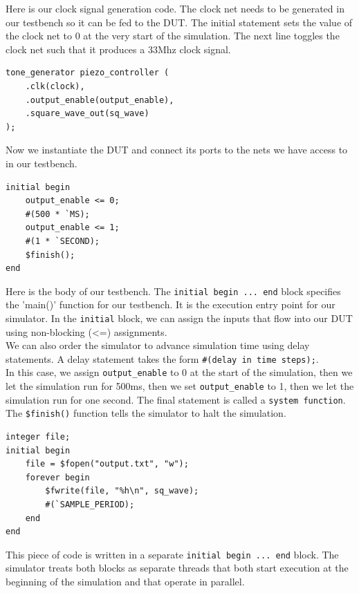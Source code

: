 \documentclass[11pt]{article}
\begin{document}
Here is our clock signal generation code. The clock net needs to be generated in our testbench so it can be fed to the DUT. The initial statement sets the value of the clock net to 0 at the very start of the simulation. The next line toggles the clock net such that it produces a 33Mhz clock signal.

\begin{verbatim}
tone_generator piezo_controller (
    .clk(clock),
    .output_enable(output_enable),
    .square_wave_out(sq_wave)
);
\end{verbatim}

Now we instantiate the DUT and connect its ports to the nets we have access to in our testbench.

\begin{verbatim}
initial begin
    output_enable <= 0;
    #(500 * `MS);
    output_enable <= 1;
    #(1 * `SECOND);
    $finish();
end
\end{verbatim}

Here is the body of our testbench. The \verb|initial begin ... end| block specifies the 'main()' function for our testbench. It is the execution entry point for our simulator. In the \verb|initial| block, we can assign the inputs that flow into our DUT using non-blocking (<=) assignments. \\

We can also order the simulator to advance simulation time using delay statements. A delay statement takes the form \verb|#(delay in time steps);|.\\

In this case, we assign \verb|output_enable| to 0 at the start of the simulation, then we let the simulation run for 500ms, then we set \verb|output_enable| to 1, then we let the simulation run for one second. The final statement is called a \verb|system function|. The \verb|$finish()| function tells the simulator to halt the simulation.

\begin{verbatim}
integer file;
initial begin
	file = $fopen("output.txt", "w");
	forever begin
		$fwrite(file, "%h\n", sq_wave);
		#(`SAMPLE_PERIOD);
	end
end
\end{verbatim}

This piece of code is written in a separate \verb|initial begin ... end| block. The simulator treats both blocks as separate threads that both start execution at the beginning of the simulation and that operate in parallel.\\
\end{document}

